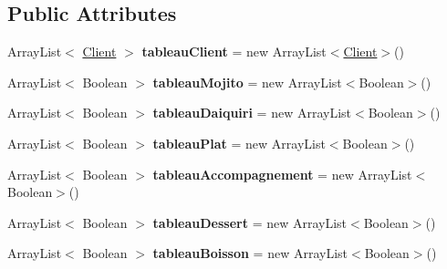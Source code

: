 \subsection*{Public Attributes}
\begin{DoxyCompactItemize}
\item 
Array\+List$<$ \hyperlink{classclient_1_1_client}{Client} $>$ {\bfseries tableau\+Client} = new Array\+List$<$\hyperlink{classclient_1_1_client}{Client}$>$()\hypertarget{classrestaurant_1_1_restaurant_a9e8dd99b00e51f2172b51f37c9bda406}{}\label{classrestaurant_1_1_restaurant_a9e8dd99b00e51f2172b51f37c9bda406}

\item 
Array\+List$<$ Boolean $>$ {\bfseries tableau\+Mojito} = new Array\+List$<$Boolean$>$()\hypertarget{classrestaurant_1_1_restaurant_a98c8eae71bc6589701ac2ccd5d16e01e}{}\label{classrestaurant_1_1_restaurant_a98c8eae71bc6589701ac2ccd5d16e01e}

\item 
Array\+List$<$ Boolean $>$ {\bfseries tableau\+Daiquiri} = new Array\+List$<$Boolean$>$()\hypertarget{classrestaurant_1_1_restaurant_a2a6a4b5dd85b006059e87be4fef93403}{}\label{classrestaurant_1_1_restaurant_a2a6a4b5dd85b006059e87be4fef93403}

\item 
Array\+List$<$ Boolean $>$ {\bfseries tableau\+Plat} = new Array\+List$<$Boolean$>$()\hypertarget{classrestaurant_1_1_restaurant_ada5cac3fef31b022efe7c5d5980bd207}{}\label{classrestaurant_1_1_restaurant_ada5cac3fef31b022efe7c5d5980bd207}

\item 
Array\+List$<$ Boolean $>$ {\bfseries tableau\+Accompagnement} = new Array\+List$<$Boolean$>$()\hypertarget{classrestaurant_1_1_restaurant_a0804ce7004986cba969c1a1912804fb6}{}\label{classrestaurant_1_1_restaurant_a0804ce7004986cba969c1a1912804fb6}

\item 
Array\+List$<$ Boolean $>$ {\bfseries tableau\+Dessert} = new Array\+List$<$Boolean$>$()\hypertarget{classrestaurant_1_1_restaurant_af0b87633c874187760dc7d2fd8d8d51c}{}\label{classrestaurant_1_1_restaurant_af0b87633c874187760dc7d2fd8d8d51c}

\item 
Array\+List$<$ Boolean $>$ {\bfseries tableau\+Boisson} = new Array\+List$<$Boolean$>$()\hypertarget{classrestaurant_1_1_restaurant_a059727139477e6b4fe0592a4b236b8b2}{}\label{classrestaurant_1_1_restaurant_a059727139477e6b4fe0592a4b236b8b2}


\end{DoxyCompactItemize}
